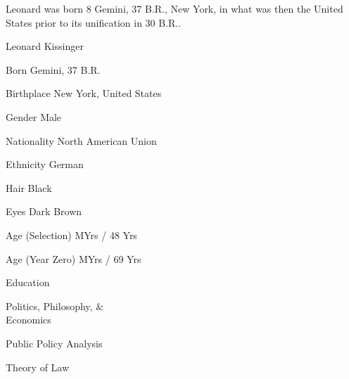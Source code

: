 

Leonard was born 8 Gemini, 37 B.R., New York, in what was then the United States prior to its unification in 30 B.R..
{
    \SetupCharacterTable

    \bTABLEbody

        \bTR 
            \bTD[nc=2] \midaligned{\rotate[rotation=42]{\color[red]{\bft Todo: Character's image goes here.}}} \eTD 
        \eTR

        \bTR 
            \bTD[nc=2] Leonard Kissinger \eTD 
        \eTR

        \bTR
            \bTC Born \eTC
             Gemini, 37 B.R. \eTC
        \eTR
        
        \bTR
            \bTC Birthplace \eTC
            \bTC New York, United States \eTC
        \eTR
        
        \bTR
            \bTC Gender \eTC
            \bTC Male \eTC
        \eTR
            
        \bTR
            \bTC Nationality \eTC
            \bTC North American Union \eTC
        \eTR
        
        \bTR
            \bTC Ethnicity \eTC
            \bTC German \eTC
        \eTR
        
        \bTR
          \bTC Hair \eTC
          \bTC Black \eTC
        \eTR
        
        \bTR
            \bTC Eyes \eTC
            \bTC Dark Brown \eTC
        \eTR

        \bTR
            \bTC Age (Selection) \eTC %
             MYrs / 48 Yrs \eTC %
        \eTR

        \bTR
            \bTC Age (Year Zero) \eTC
             MYrs / 69 Yrs \eTC
        \eTR

        \bTR
            \bTC Education \eTC
            \bTC 
                \startitemize[4]
                \startpacked
                \item Politics, Philosophy, &\\Economics
                \item Public Policy Analysis
                \item Theory of Law
                \stoppacked
                \stopitemize
            \eTC
        \eTR
        
}
